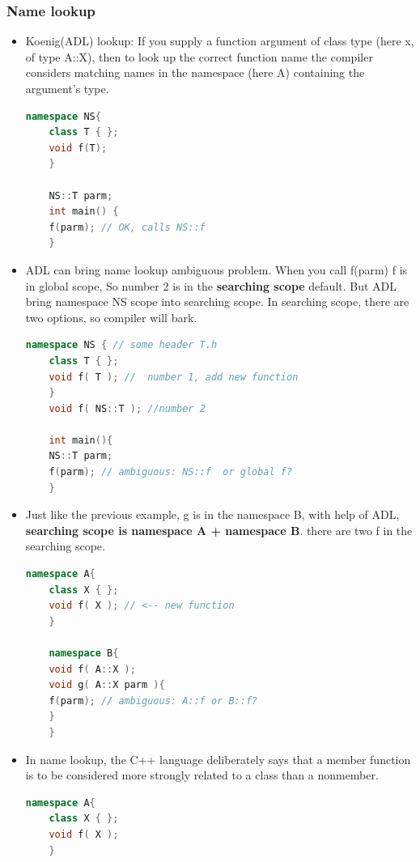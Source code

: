 \documentclass[a4paper,12pt,twoside]{book}
\begin{document}
\subsubsection{Name lookup}
\begin{itemize}
	
	\item Koenig(ADL) lookup: If you supply a function argument of class type (here x, of type A::X), then to look up the correct function name the compiler considers matching names in the namespace (here A) containing the argument's type.
	
	\begin{lstlisting}[frame=single, language=c++]
	namespace NS{
	class T { };
	void f(T);
	}
	
	NS::T parm;
	int main() {
	f(parm); // OK, calls NS::f
	}
	\end{lstlisting}
	
	\item ADL can bring name lookup ambiguous problem.  When you call f(parm) f is in global scope, So number 2 is in the \textbf{searching scope} default. But ADL bring namespace NS scope into searching scope. In searching scope, there are two options, so compiler will bark.
	
	\begin{lstlisting}[frame=single, language=c++]
	namespace NS { // some header T.h
	class T { };
	void f( T ); //  number 1, add new function
	}
	void f( NS::T ); //number 2
	
	int main(){
	NS::T parm;
	f(parm); // ambiguous: NS::f  or global f?
	}
	\end{lstlisting}
	
	\item Just like the previous example, g is in the namespace B, with help of ADL, \textbf{searching scope is namespace A + namespace B}. there are two f in the searching scope.
	
	\begin{lstlisting}[frame=single, language=c++]
	namespace A{
	class X { };
	void f( X ); // <-- new function
	}
	
	namespace B{
	void f( A::X );
	void g( A::X parm ){
	f(parm); // ambiguous: A::f or B::f?
	}
	}
	\end{lstlisting}
	
	\item In name lookup, the C++ language deliberately says that a member function is to be considered more strongly related to a class than a nonmember.
	\begin{lstlisting}[frame=single, language=c++]
	namespace A{
	class X { };
	void f( X );
	}
	

\end{lstlisting}
\end{itemize}
\end{document}
